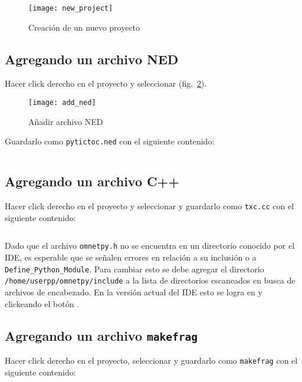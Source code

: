 \begin{figure}[h]
\caption{Creación de un nuevo proyecto}
\label{fig:new_project}
\centering
\texttt{[image: new\_project]}
\end{figure}

\subsection{Agregando un archivo NED}

Hacer click derecho en el proyecto y seleccionar  (fig.~\ref{fig:new_ned}).

\begin{figure}[h]
\caption{Añadir archivo NED}
\label{fig:new_ned}
\centering
\texttt{[image: add\_ned]}
\end{figure}

Guardarlo como \verb!pytictoc.ned! con el siguiente contenido:

\inputminted{text}{codelistings/tictoc.ned}

\subsection{Agregando un archivo C++}

Hacer click derecho en el proyecto y seleccionar  y
guardarlo como \verb!txc.cc! con el siguiente contenido:

\inputminted{c++}{codelistings/tictoc.cc}

Dado que el archivo \verb!omnetpy.h! no se encuentra en un directorio conocido
por el IDE, es esperable que se señalen errores en relación a su inclusión o a
\verb!Define_Python_Module!. Para cambiar esto se debe agregar el directorio
\verb!/home/userpp/omnetpy/include! a la lista de directorios escaneados en
busca de archivos de encabezado. En la versión actual del IDE esto se logra en
 y clickeando el botón .

\subsection{Agregando un archivo \texttt{makefrag}}

Hacer click derecho en el proyecto, seleccionar  y
guardarlo como \verb!makefrag! con el siguiente contenido:

